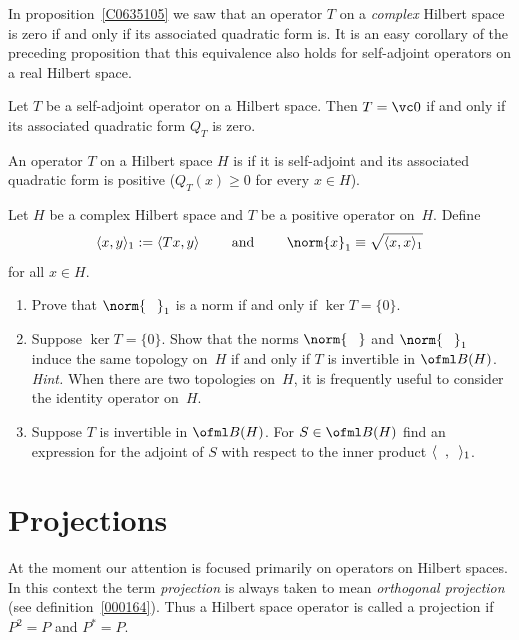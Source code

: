 In proposition~\ref{C0635105} we saw that an operator $T$ on a \emph{complex} Hilbert space is zero if and only if its
associated quadratic form is.  It is an easy corollary of  the preceding proposition that this equivalence also holds
for self-adjoint operators on a real Hilbert space.

\begin{cor}\label{real_HSp_zero_Qform} Let $T$ be a self-adjoint operator on a Hilbert space.  Then $T = \vc 0$ if and
only if its associated quadratic form $Q_T$ is zero.
\end{cor}

\begin{defn} An operator $T$ on a Hilbert space $H$ is
 if it is self-adjoint and its associated quadratic form is positive ($Q_T(x) \ge 0$ for every $x \in H$).
\end{defn}

\begin{exer} Let $H$ be a complex Hilbert space and $T$ be a positive operator on~$H$.  Define
   \[ \langle x,y \rangle_1 := \langle Tx,y \rangle \qquad \text{ and } \qquad \norm{x}_1 \equiv \sqrt{\langle x,x \rangle_1} \]
for all $x \in H$.
 \begin{enumerate}
  \item[(a)] Prove that $\norm{\hphantom O}_1$ is a norm if and only if $\ker T = \{0\}$.
  \item[(b)] Suppose $\ker T = \{0\}$. Show that the norms $\norm{\hphantom O}$ and
$\norm{\hphantom O}_1$ induce the same topology on~$H$ if and only if $T$ is invertible in
$\ofml B(H)$. \emph{Hint.}  When there are two topologies on~$H$, it is frequently useful to
consider the identity operator on~$H$.
  \item[(c)] Suppose $T$ is invertible in $\ofml B(H)$.  For $S \in \ofml B(H)$ find an expression for the
adjoint of $S$ with respect to the inner product $\langle \hphantom x , \hphantom y \rangle_1$.
 \end{enumerate}
\end{exer}


















\section{Projections}
\begin{conv} At the moment our attention is focused primarily on
operators on Hilbert spaces.  In this context the term \emph{projection} is always taken
to mean \emph{orthogonal projection} (see definition~\ref{000164}).  Thus a Hilbert space
operator is called a projection if $P^2 = P$ and $P^* = P$.
\end{conv}


